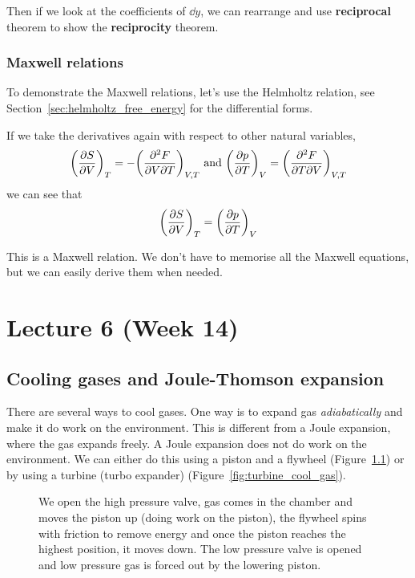 \documentclass[12pt,chapterprefix=false,dvipsnames]{scrbook}
\theoremstyle{dotless}
\theoremstyle{definition}
\begin{document}
Then if we look at the coefficients of $\dd{y}$,
we can rearrange and use \textbf{reciprocal} theorem to
show the \textbf{reciprocity} theorem.

\subsection{Maxwell relations}%
\label{sub:maxwell_relations}

To demonstrate the Maxwell relations, let's use the Helmholtz
relation, see Section~\ref{sec:helmholtz_free_energy} for the
differential forms.

If we take the derivatives again with respect to other natural
variables,
\begin{equation}
	{\left(\pdv{S}{V}\right)}_T =
	-{\left(\pdv{F}{V}{T}\right)}_{V,T}\,\, \text{and}
	\,\,{\left(\pdv{p}{T}\right)}_V = {\left(\pdv{F}{T}{V}\right)}_{V,T}
\end{equation}
we can see that
\begin{equation}
	{\left(\pdv{S}{V}\right)}_T = {\left(\pdv{p}{T}\right)}_V
\end{equation}

This is a Maxwell relation. We don't have to memorise all the
Maxwell equations, but we can easily derive them when needed.

\chapter{Lecture 6 (Week 14)}%
\label{cha:lecture_6}

\section{Cooling gases and Joule-Thomson expansion}%
\label{sec:cooling_gases_joule_thomson_expansion}

There are several ways to cool gases. One way is to expand gas
\textit{adiabatically} and make it do work on the environment.
This is different from a Joule expansion, where the gas expands
freely. A Joule expansion does not do work on the environment.
We can either do this using a piston and a flywheel
(Figure~\ref{fig:piston_flywheel}) or by using a turbine (turbo
expander) (Figure~\ref{fig:turbine_cool_gas}).

\begin{figure}[htpb]
	\centering
	
	\caption{We open the high pressure valve, gas comes in the chamber and moves the piston up (doing work on
		the piston), the flywheel spins with friction to remove energy and once the
		piston reaches the highest position, it moves down. The low pressure valve is opened and low pressure
		gas is forced out by the lowering piston.}%
	\label{fig:piston_flywheel}
\end{figure}
\end{document}

